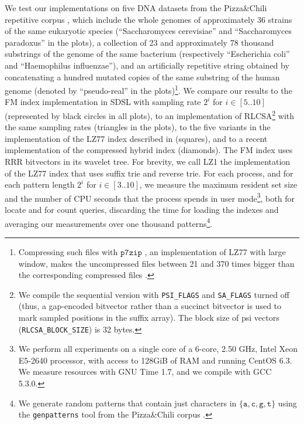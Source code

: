 \documentclass[a4paper,UKenglish]{lipics-v2016}
\begin{document}
We test our implementations on five DNA datasets from the Pizza\&Chili repetitive corpus \cite{pizzachili}, which include the whole genomes of approximately 36 strains of the same eukaryotic species (``Saccharomyces cerevisiae'' and ``Saccharomyces paradoxus'' in the plots), a collection of 23 and approximately 78 thousand substrings of the genome of the same bacterium (respectively ``Escherichia coli'' and ``Haemophilus influenzae''), and an artificially repetitive string obtained by concatenating a hundred mutated copies of the same substring of the human genome (denoted by ``pseudo-real'' in the plots)\footnote{Compressing such files with $\mathtt{p7zip}$ \cite{p7zip}, an implementation of LZ77 with large window, makes the uncompressed files between 21 and 370 times bigger than the corresponding compressed files \cite{pizzachili}.}. We compare our results to the FM index implementation in SDSL \cite{gbmp2014sea} with sampling rate $2^i$ for $i \in [5..10]$ (represented by black circles in all plots), to an implementation of RLCSA\footnote{We compile the sequential version with \texttt{PSI\_FLAGS} and \texttt{SA\_FLAGS} turned off (thus, a gap-encoded bitvector rather than a succinct bitvector is used to mark sampled positions in the suffix array). The block size of psi vectors (\texttt{RLCSA\_BLOCK\_SIZE}) is 32 bytes.} \cite{adamnovak} with the same sampling rates (triangles in the plots), to the five variants in the implementation of the LZ77 index described in \cite{kreft2010self} (squares), and to a recent implementation of the compressed hybrid index \cite{valenzuela2016chico} (diamonds). The FM index uses RRR bitvectors in its wavelet tree. For brevity, we call LZ1 the implementation of the LZ77 index that uses suffix trie and reverse trie. For each process, and for each pattern length $2^i$ for $i \in [3..10]$, we measure the maximum resident set size and the number of CPU seconds that the process spends in user mode\footnote{We perform all experiments on a single core of a 6-core, 2.50 GHz, Intel Xeon E5-2640 processor, with access to 128GiB of RAM and running CentOS 6.3. We measure resources with GNU Time 1.7, and we compile with GCC 5.3.0.}, both for locate and for count queries, discarding the time for loading the indexes and averaging our measurements over one thousand patterns\footnote{We generate random patterns that contain just characters in $\{\mathtt{a},\mathtt{c},\mathtt{g},\mathtt{t}\}$ using the \texttt{genpatterns} tool from the Pizza\&Chili corpus \cite{pizzachili}.}.
\end{document}

